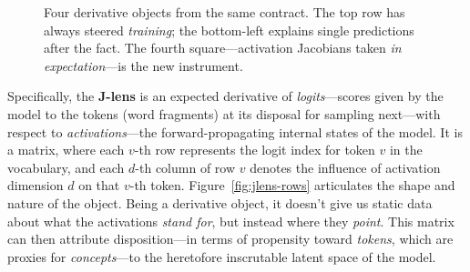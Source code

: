 \documentclass{article}
\newcommand{\logits}{\mathrm{logits}}
\begin{document}
\begin{figure}[htbp]
\centering
{}
\caption{Four derivative objects from the same contract. The top row has always steered \emph{training}; the bottom-left explains single predictions after the fact. The fourth square---activation Jacobians taken \emph{in expectation}---is the new instrument.}
\label{fig:four-square}
\end{figure}


Specifically, the \textbf{J-lens} is an expected derivative of \textit{logits}---scores given by the model to the tokens (word fragments) at its disposal for sampling next---with respect to \textit{activations}---the forward-propagating internal states of the model. It is a matrix, where each \(v\)-th row represents the logit index for token \(v\) in the vocabulary, and each \(d\)-th column of row \(v\) denotes the influence of activation dimension \(d\) on that \(v\)-th token. Figure~\ref{fig:jlens-rows} articulates the shape and nature of the object. Being a derivative object, it doesn't give us static data about what the activations \textit{stand for}, but instead where they \textit{point}. This matrix can then attribute disposition---in terms of propensity toward \textit{tokens}, which are proxies for \textit{concepts}---to the heretofore inscrutable latent space of the model. 
\end{document}
